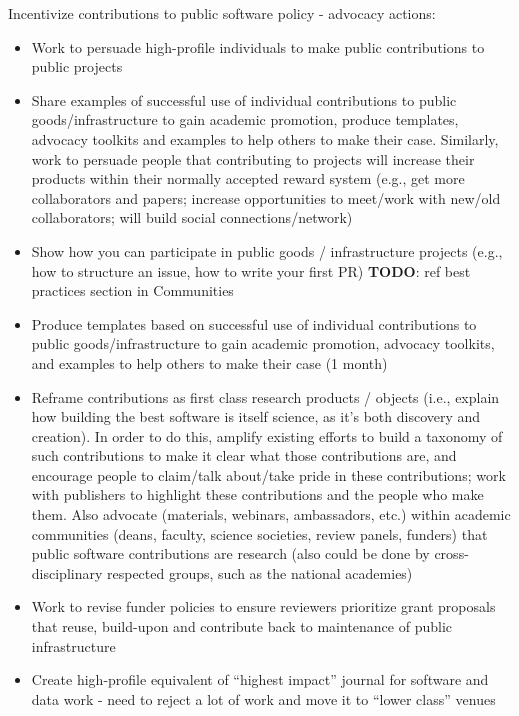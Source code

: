 \documentclass[
]{book}
\begin{document}
Incentivize contributions to public software policy - advocacy actions:

\begin{itemize}
\item
  Work to persuade high-profile individuals to make public contributions to public projects
\item
  Share examples of successful use of individual contributions to public goods/infrastructure
  to gain academic promotion, produce templates, advocacy toolkits and examples to help others
  to make their case. Similarly, work to persuade people that contributing to projects will
  increase their products within their normally accepted reward system (e.g., get more collaborators
  and papers; increase opportunities to meet/work with new/old collaborators; will build social
  connections/network)
\item
  Show how you can participate in public goods / infrastructure projects (e.g., how to
  structure an issue, how to write your first PR)
  \textbf{TODO}: ref best practices section in Communities
\item
  Produce templates based on successful use of individual contributions to public
  goods/infrastructure to gain academic promotion, advocacy toolkits, and examples to help
  others to make their case (1 month)
\item
  Reframe contributions as first class research products / objects (i.e., explain how building
  the best software is itself science, as it's both discovery and creation). In order to do this,
  amplify existing efforts to build a taxonomy of such contributions to make it clear what those
  contributions are, and encourage people to claim/talk about/take pride in these contributions;
  work with publishers to highlight these contributions and the people who make them. Also advocate
  (materials, webinars, ambassadors, etc.) within academic communities (deans, faculty, science
  societies, review panels, funders) that public software contributions are research (also could
  be done by cross-disciplinary respected groups, such as the national academies)
\item
  Work to revise funder policies to ensure reviewers prioritize grant proposals that reuse,
  build-upon and contribute back to maintenance of public infrastructure
\item
  Create high-profile equivalent of ``highest impact'' journal for software and data work - need
  to reject a lot of work and move it to ``lower class'' venues
\end{itemize}
\end{document}
